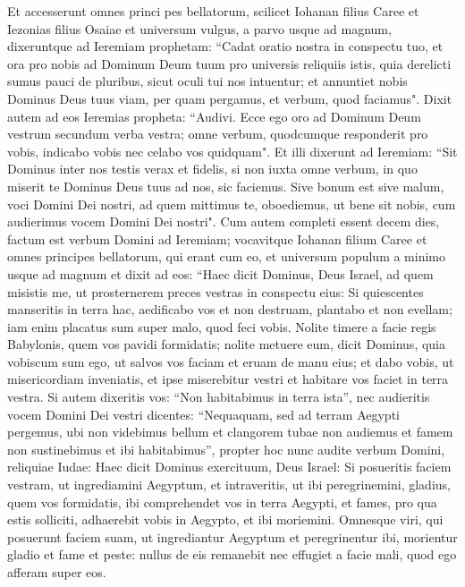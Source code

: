\begin{biblechapter}  
\verse Et accesserunt omnes princi pes bellatorum, scilicet Iohanan filius Caree et Iezonias filius Osaiae et universum vulgus, a parvo usque ad magnum, 
\verse dixeruntque ad Ieremiam prophetam: “Cadat oratio nostra in conspectu tuo, et ora pro nobis ad Dominum Deum tuum pro universis reliquiis istis, quia derelicti sumus pauci de pluribus, sicut oculi tui nos intuentur; 
\verse et annuntiet nobis Dominus Deus tuus viam, per quam pergamus, et verbum, quod faciamus". 
\verse Dixit autem ad eos Ieremias propheta: “Audivi. Ecce ego oro ad Dominum Deum vestrum secundum verba vestra; omne verbum, quodcumque responderit pro vobis, indicabo vobis nec celabo vos quidquam". 
\verse Et illi dixerunt ad Ieremiam: “Sit Dominus inter nos testis verax et fidelis, si non iuxta omne verbum, in quo miserit te Dominus Deus tuus ad nos, sic faciemus. 
\verse Sive bonum est sive malum, voci Domini Dei nostri, ad quem mittimus te, oboediemus, ut bene sit nobis, cum audierimus vocem Domini Dei nostri". 
\verse Cum autem completi essent decem dies, factum est verbum Domini ad Ieremiam;  
\verse vocavitque Iohanan filium Caree et omnes principes bellatorum, qui erant cum eo, et universum populum a minimo usque ad magnum 
\verse et dixit ad eos: “Haec dicit Dominus, Deus Israel, ad quem misistis me, ut prosternerem preces vestras in conspectu eius: 
\verse Si quiescentes manseritis in terra hac, aedificabo vos et non destruam, plantabo et non evellam; iam enim placatus sum super malo, quod feci vobis. 
\verse Nolite timere a facie regis Babylonis, quem vos pavidi formidatis; nolite metuere eum, dicit Dominus, quia vobiscum sum ego, ut salvos vos faciam et eruam de manu eius; 
\verse et dabo vobis, ut misericordiam inveniatis, et ipse miserebitur vestri et habitare vos faciet in terra vestra. 
\verse Si autem dixeritis vos: “Non habitabimus in terra ista”, nec audieritis vocem Domini Dei vestri 
\verse dicentes: “Nequaquam, sed ad terram Aegypti pergemus, ubi non videbimus bellum et clangorem tubae non audiemus et famem non sustinebimus et ibi habitabimus”, 
\verse propter hoc nunc audite verbum Domini, reliquiae Iudae: Haec dicit Dominus exercituum, Deus Israel: Si posueritis faciem vestram, ut ingrediamini Aegyptum, et intraveritis, ut ibi peregrinemini, 
\verse gladius, quem vos formidatis, ibi comprehendet vos in terra Aegypti, et fames, pro qua estis solliciti, adhaerebit vobis in Aegypto, et ibi moriemini. 
\verse Omnesque viri, qui posuerunt faciem suam, ut ingrediantur Aegyptum et peregrinentur ibi, morientur gladio et fame et peste: nullus de eis remanebit nec effugiet a facie mali, quod ego afferam super eos. 

\end{biblechapter}
